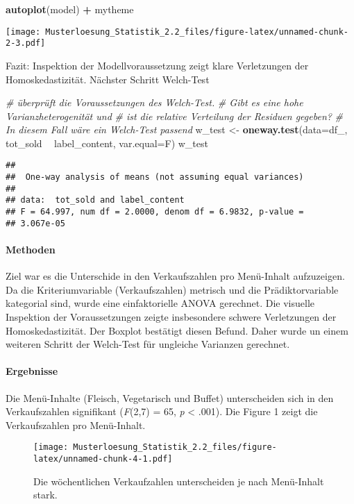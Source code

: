 \documentclass[]{article}
\newenvironment{Shaded}{\begin{snugshade}}{\end{snugshade}}
\newcommand{\KeywordTok}[1]{\textcolor[rgb]{0.13,0.29,0.53}{\textbf{#1}}}
\newcommand{\DataTypeTok}[1]{\textcolor[rgb]{0.13,0.29,0.53}{#1}}
\newcommand{\StringTok}[1]{\textcolor[rgb]{0.31,0.60,0.02}{#1}}
\newcommand{\CommentTok}[1]{\textcolor[rgb]{0.56,0.35,0.01}{\textit{#1}}}
\newcommand{\OperatorTok}[1]{\textcolor[rgb]{0.81,0.36,0.00}{\textbf{#1}}}
\newcommand{\NormalTok}[1]{#1}
\let\oldparagraph\paragraph
\renewcommand{\paragraph}[1]{\oldparagraph{#1}\mbox{}}
\begin{document}
\begin{Shaded}
\begin{Highlighting}[]
\KeywordTok{autoplot}\NormalTok{(model) }\OperatorTok{+}\StringTok{ }\NormalTok{mytheme }
\end{Highlighting}
\end{Shaded}

\texttt{[image: Musterloesung\_Statistik\_2.2\_files/figure-latex/unnamed-chunk-2-3.pdf]}

Fazit: Inspektion der Modellvoraussetzung zeigt klare Verletzungen der
Homoskedastizität. Nächster Schritt Welch-Test

\begin{Shaded}
\begin{Highlighting}[]
\CommentTok{# überprüft die Voraussetzungen des Welch-Test.}
\CommentTok{# Gibt es eine hohe Varianzheterogenität und }
\CommentTok{# ist die relative Verteilung der Residuen gegeben? }
\CommentTok{# In diesem Fall wäre ein Welch-Test passend}
\NormalTok{w_test <-}\StringTok{ }\KeywordTok{oneway.test}\NormalTok{(}\DataTypeTok{data=}\NormalTok{df_, tot_sold }\OperatorTok{~}\StringTok{ }\NormalTok{label_content, }\DataTypeTok{var.equal=}\NormalTok{F)}
\NormalTok{w_test}
\end{Highlighting}
\end{Shaded}

\begin{verbatim}
## 
##  One-way analysis of means (not assuming equal variances)
## 
## data:  tot_sold and label_content
## F = 64.997, num df = 2.0000, denom df = 6.9832, p-value =
## 3.067e-05
\end{verbatim}

\paragraph{Methoden}\label{methoden}

Ziel war es die Unterschide in den Verkaufszahlen pro Menü-Inhalt
aufzuzeigen. Da die Kriteriumvariable (Verkaufszahlen) metrisch und die
Prädiktorvariable kategorial sind, wurde eine einfaktorielle ANOVA
gerechnet. Die visuelle Inspektion der Voraussetzungen zeigte
insbesondere schwere Verletzungen der Homoskedastizität. Der Boxplot
bestätigt diesen Befund. Daher wurde un einem weiteren Schritt der
Welch-Test für ungleiche Varianzen gerechnet.

\paragraph{Ergebnisse}\label{ergebnisse}

Die Menü-Inhalte (Fleisch, Vegetarisch und Buffet) unterscheiden sich in
den Verkaufszahlen signifikant (\emph{F}(2,7) = 65, \emph{p} \textless{}
.001). Die Figure 1 zeigt die Verkaufszahlen pro Menü-Inhalt.

\begin{figure}
\centering
\texttt{[image: Musterloesung\_Statistik\_2.2\_files/figure-latex/unnamed-chunk-4-1.pdf]}
\caption{Die wöchentlichen Verkaufzahlen unterscheiden je nach
Menü-Inhalt stark.}
\end{figure}
\end{document}
